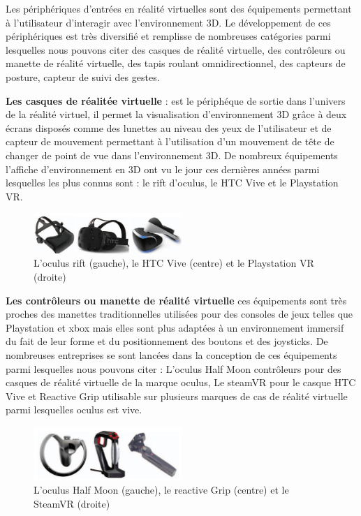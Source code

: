 Les périphériques d'entrées en réalité virtuelles sont des équipements permettant à l'utilisateur d'interagir avec l'environnement 3D. 
Le développement de ces périphériques est très diversifié et remplisse de nombreuses catégories parmi lesquelles nous pouvons citer des casques de réalité virtuelle, des contrôleurs ou manette de réalité virtuelle, des tapis roulant omnidirectionnel, des capteurs de posture, capteur de suivi des gestes\cite{anthes2016state}.

\textbf{Les casques de réalitée virtuelle} : est le périphéque de sortie dans l'univers de la réalité virtuel, il permet la visualisation d'environnement 3D grâce à deux écrans disposés comme des lunettes au niveau des yeux de l'utilisateur et de capteur de mouvement permettant à l'utilisation d'un mouvement de tête de changer de point de vue dans l'environnement 3D.
De nombreux équipements l'affiche d'environnement en 3D ont vu le jour ces dernières années parmi lesquelles les plus connus sont : le rift d'oculus, le HTC Vive et le Playstation VR.

\begin{figure}[H]
	\centering
	\includegraphics[width=0.5\textwidth]{img/3dcs}
	\caption{L'oculus rift (gauche), le HTC Vive (centre) et le Playstation VR (droite) }
\end{figure}

\textbf{Les contrôleurs ou manette de réalité virtuelle} ces équipements sont très proches des manettes traditionnelles utilisées pour des consoles de jeux telles que Playstation et xbox mais elles sont plus adaptées à un environnement immersif du fait de leur forme et du positionnement des boutons et des joysticks.
De nombreuses entreprises se sont lancées dans la conception de ces équipements parmi lesquelles nous pouvons citer : L'oculus Half Moon contrôleurs pour des casques de réalité virtuelle de la marque oculus, Le steamVR pour le casque HTC Vive et Reactive Grip utilisable sur plusieurs marques de cas de réalité virtuelle parmi lesquelles oculus est vive.

\begin{figure}[H]
	\centering
	\includegraphics[width=0.5\textwidth]{img/3dcon}
	\caption{L'oculus Half Moon (gauche), le reactive Grip (centre) et le SteamVR (droite) }
\end{figure}

